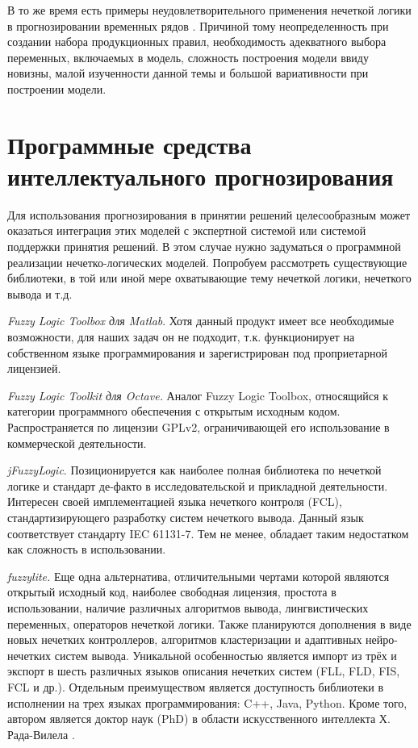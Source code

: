 В то же время есть примеры неудовлетворительного применения нечеткой логики в прогнозировании временных рядов \cite{Hoekstr2010}. 
Причиной тому неопределенность при создании набора продукционных правил, необходимость адекватного выбора переменных, 
включаемых в модель, сложность построения модели ввиду новизны, малой изученности данной темы и большой вариативности при построении модели.

\section{Программные средства интеллектуального прогнозирования}

Для использования прогнозирования в принятии решений целесообразным может
оказаться интеграция этих моделей с экспертной системой или системой поддержки
принятия решений.  В этом случае нужно задуматься о программной реализации
нечетко-логических моделей.  Попробуем рассмотреть существующие библиотеки, в
той или иной мере охватывающие тему нечеткой логики, нечеткого вывода и т.д.

\textit{Fuzzy Logic Toolbox для Matlab}. Хотя данный продукт имеет все
необходимые возможности, для наших задач он не подходит, т.к. функционирует на
собственном языке программирования и зарегистрирован под проприетарной лицензией.

\textit{Fuzzy Logic Toolkit для Octave.} Аналог Fuzzy Logic Toolbox, относящийся
к категории программного обеспечения с открытым исходным кодом. Распространяется
по лицензии GPLv2, ограничивающей его использование в коммерческой деятельности.

\textit{jFuzzyLogic}. Позиционируется как наиболее полная библиотека по нечеткой
логике и стандарт де-факто в исследовательской и прикладной деятельности.
Интересен своей имплементацией языка нечеткого контроля (FCL),
стандартизирующего разработку систем нечеткого вывода. Данный язык соответствует
стандарту IEC 61131-7. Тем не менее, обладает таким недостатком как сложность в
использовании.

\textit{fuzzylite.} Еще одна альтернатива, отличительными чертами которой
являются открытый исходный код, наиболее свободная лицензия, простота в
использовании, наличие различных алгоритмов вывода, лингвистических переменных,
операторов нечеткой логики. Также планируются дополнения в виде новых нечетких
контроллеров, алгоритмов кластеризации и адаптивных нейро-нечетких систем
вывода. Уникальной особенностью является импорт из трёх и экспорт в шесть
различных языков описания нечетких систем (FLL, FLD, FIS, FCL и др.).  Отдельным
преимуществом является доступность библиотеки в исполнении на трех языках
программирования: C++, Java, Python. Кроме того, автором является доктор наук
(PhD) в области искусственного интеллекта Х. Рада-Вилела \cite{RadaVilela2014}.

